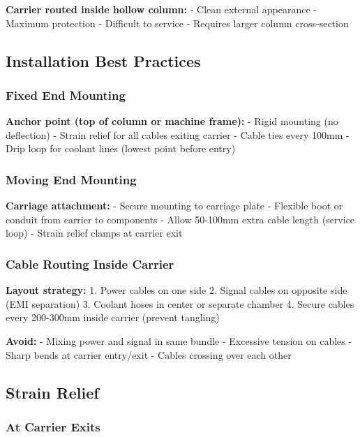 \documentclass[
]{article}
\begin{document}
\textbf{Carrier routed inside hollow column:} - Clean external
appearance - Maximum protection - Difficult to service - Requires larger
column cross-section

\subsection{Installation Best
Practices}\label{installation-best-practices}

\subsubsection{Fixed End Mounting}\label{fixed-end-mounting}

\textbf{Anchor point (top of column or machine frame):} - Rigid mounting
(no deflection) - Strain relief for all cables exiting carrier - Cable
ties every 100mm - Drip loop for coolant lines (lowest point before
entry)

\subsubsection{Moving End Mounting}\label{moving-end-mounting}

\textbf{Carriage attachment:} - Secure mounting to carriage plate -
Flexible boot or conduit from carrier to components - Allow 50-100mm
extra cable length (service loop) - Strain relief clamps at carrier exit

\subsubsection{Cable Routing Inside
Carrier}\label{cable-routing-inside-carrier}

\textbf{Layout strategy:} 1. Power cables on one side 2. Signal cables
on opposite side (EMI separation) 3. Coolant hoses in center or separate
chamber 4. Secure cables every 200-300mm inside carrier (prevent
tangling)

\textbf{Avoid:} - Mixing power and signal in same bundle - Excessive
tension on cables - Sharp bends at carrier entry/exit - Cables crossing
over each other

\subsection{Strain Relief}\label{strain-relief}

\subsubsection{At Carrier Exits}\label{at-carrier-exits}
\end{document}
